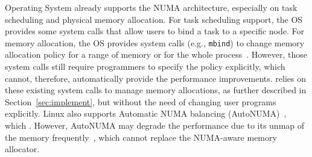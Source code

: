 





Operating System already supports the NUMA architecture, especially on task scheduling and physical memory allocation. For task scheduling support, the OS provides some system calls that allow users to bind a task to a specific node. For memory allocation, the OS provides system calls (e.g., \texttt{mbind}) to change memory allocation policy for a range of memory or for the whole process~\cite{lameter2013numa, diener2015locality}. However, those system calls still require programmers to specify the policy explicitly, which cannot, therefore, automatically provide the performance improvements. \NM{} relies on these existing system calls to manage memory allocations, as further described in Section~\ref{sec:implement}, but without the need of changing user programs explicitly. Linux also supports Automatic NUMA balancing (AutoNUMA)~\cite{AutoNUMA2}, which . However, AutoNUMA may degrade the performance due to its unmap of the memory frequently~\cite{autonumaissue}, which cannot replace the NUMA-aware memory allocator. 

